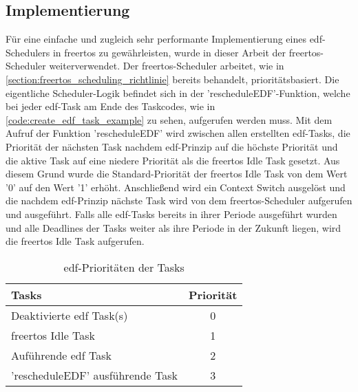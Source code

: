\documentclass[../EDF Master Thesis.tex]{subfiles}
\begin{document}
\subsection{Implementierung} \label{section:implementierung}
    Für eine einfache und zugleich sehr performante Implementierung eines \ac{edf}-Schedulers in \ac{freertos} zu gewährleisten, wurde in dieser Arbeit der \ac{freertos}-Scheduler weiterverwendet.
    Der \ac{freertos}-Scheduler arbeitet, wie in \autoref{section:freertos_scheduling_richtlinie} bereits behandelt, prioritätsbasiert.
    Die eigentliche Scheduler-Logik befindet sich in der 'rescheduleEDF'-Funktion, welche bei jeder \ac{edf}-Task am Ende des Taskcodes, wie in \autoref{code:create_edf_task_example} zu sehen, aufgerufen werden muss.
    Mit dem Aufruf der Funktion 'rescheduleEDF' wird zwischen allen erstellten \ac{edf}-Tasks, die Priorität der nächsten Task nachdem \ac{edf}-Prinzip auf die höchste Priorität und die aktive Task auf eine niedere Priorität als die \ac{freertos} Idle Task gesetzt.
    Aus diesem Grund wurde die Standard-Priorität der \ac{freertos} Idle Task von dem Wert '0' auf den Wert '1' erhöht.
    Anschließend wird ein Context Switch ausgelöst und die nachdem \ac{edf}-Prinzip nächste Task wird von dem \ac{freertos}-Scheduler aufgerufen und ausgeführt.
    Falls alle \ac{edf}-Tasks bereits in ihrer Periode ausgeführt wurden und alle Deadlines der Tasks weiter als ihre Periode in der Zukunft liegen, wird die \ac{freertos} Idle Task aufgerufen.

    \begin{table}[ht!]
        \centering
        \begin{tabular}{l|c}
            Tasks & Priorität \\
            \hline
            Deaktivierte \ac{edf} Task(s) & 0\\
            \ac{freertos} Idle Task & 1\\
            Auführende \ac{edf} Task & 2\\
            'rescheduleEDF' ausführende Task & 3
        \end{tabular}
        \caption{\ac{edf}-Prioritäten der Tasks}
        \label{table:edf_prioritaeten_der_tasks}
    \end{table}
\end{document}
